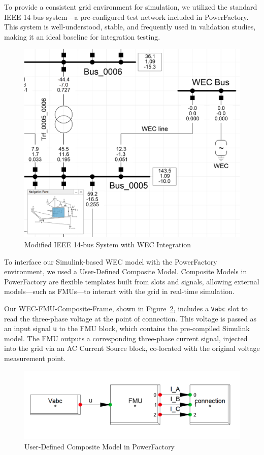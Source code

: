 \documentclass[conference]{IEEEtran}
\begin{document}
    To provide a consistent grid environment for simulation, we utilized the standard IEEE 14-bus system—a pre-configured test network included in PowerFactory. This system is well-understood, stable, and frequently used in validation studies, making it an ideal baseline for integration testing.
    
    \begin{figure}[t]
        \centering
        \includegraphics[width=0.8\linewidth,frame]{Figs/5_2_1/WEC_Bus_SLD.png}
        \caption{Modified IEEE 14-bus System with WEC Integration}
        \label{fig:WEC_bus_SLD}
    \end{figure}
    
    To interface our Simulink-based WEC model with the PowerFactory environment, we used a User-Defined Composite Model. Composite Models in PowerFactory are flexible templates built from slots and signals, allowing external models—such as FMUs—to interact with the grid in real-time simulation.
    
    Our WEC-FMU-Composite-Frame, shown in Figure~\ref{fig:comp_model}, includes a \texttt{Vabc} slot to read the three-phase voltage at the point of connection. This voltage is passed as an input signal \texttt{u} to the FMU block, which contains the pre-compiled Simulink model. The FMU outputs a corresponding three-phase current signal, injected into the grid via an AC Current Source block, co-located with the original voltage measurement point.
    
    \begin{figure}[t]
        \centering
        \includegraphics[width=1.0\linewidth]{Figs/5_2_1/Composite_Model.png}
        \caption{User-Defined Composite Model in PowerFactory}
        \label{fig:comp_model}
    \end{figure}
    
\end{document}
